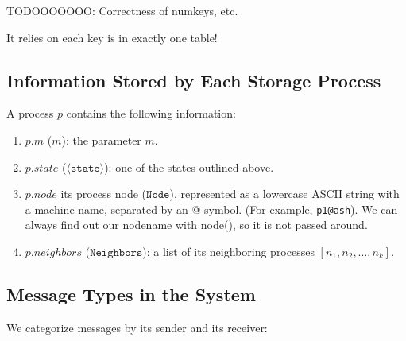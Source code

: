 \documentclass[11pt]{article}
\begin{document}
TODOOOOOOO: Correctness of numkeys, etc.

It relies on each key is in exactly one table!


\subsection{Information Stored by Each Storage Process}
A process $p$ contains the following information:
\begin{enumerate}
\item $p.m$ ($m$): the parameter $m$.
\item $p.state$ ($\langle\texttt{state}\rangle$): one of the \numStates states outlined above.
\item $p.node$ its process node ($\texttt{Node}$), represented as a lowercase ASCII string with a machine name, separated by an @ symbol. (For example, \texttt{p1@ash}). We can always find out our nodename with node(), so it is not passed around.
\item $p.neighbors$ ($\texttt{Neighbors}$): a list of its neighboring processes $[n_1, n_2, \ldots, n_k]$.
\end{enumerate}

\subsection{Message Types in the System}
We categorize messages by its sender and its receiver:
\end{document}
